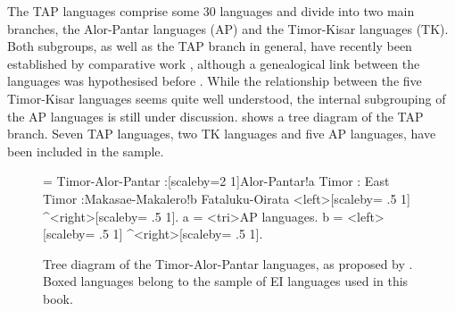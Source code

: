 The TAP languages comprise some 30 languages and divide into two main branches, the Alor-Pantar languages (\textsc{AP}) and the Timor-Kisar languages (\textsc{TK}). Both subgroups, as well as the TAP branch in general, have recently been established by comparative work \citep{holton2012historical, klamer2014alor}, although a genealogical link between the languages was hypothesised before \citep[7]{schapper2014intro}. While the relationship between the five Timor-Kisar languages seems quite well understood, the internal subgrouping of the AP languages is still under discussion.  shows a tree diagram of the TAP branch. Seven TAP languages, two TK languages and five AP languages, have been included in the sample.

\begin{figure}

\begin{footnotesize}
\jtree[xunit=5em,yunit=2em]
\! = {Timor-Alor-Pantar}
:[scaleby=2 1]{Alor-Pantar}!a {Timor}
:{} {East Timor}
:{Makasae-Makalero}!b {Fataluku-Oirata}
<left>[scaleby= .5 1]{} ^<right>[scaleby= .5 1]{}.
\!a = <tri>{AP languages}{}.
\!b = <left>[scaleby= .5 1]{} ^<right>[scaleby= .5 1]{}.
\endjtree
\end{footnotesize}

\caption[The Timor-Alor-Pantar languages]{Tree diagram of the Timor-Alor-Pantar languages, as proposed by \citet{schapper2014intro}. Boxed languages belong to the sample of EI languages used in this book.}\label{fig:timor-alor-pantar}
\end{figure}

